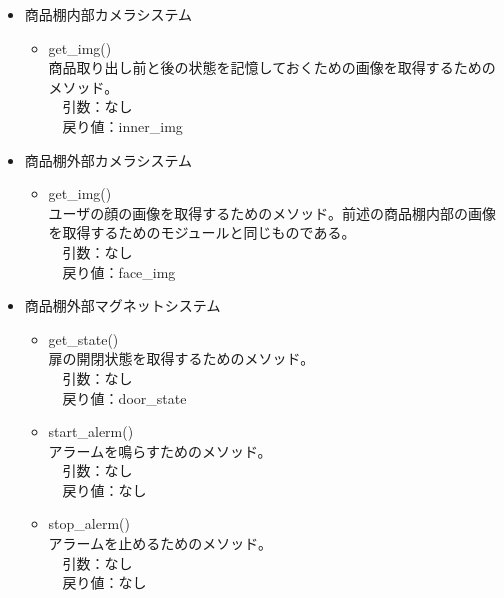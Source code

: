 \documentclass[a4, dvipdfmx, uplatex]{jsarticle}
\begin{document}
\begin{itemize}
\item 商品棚内部カメラシステム \\

\begin{itemize}
\item get\_img() \\
商品取り出し前と後の状態を記憶しておくための画像を取得するためのメソッド。 \\
　引数：なし \\
　戻り値：inner\_img \\
\end{itemize}

\item 商品棚外部カメラシステム \\

\begin{itemize}
\item get\_img() \\
ユーザの顔の画像を取得するためのメソッド。前述の商品棚内部の画像を取得するためのモジュールと同じものである。 \\
　引数：なし \\
　戻り値：face\_img \\
\end{itemize}

\item 商品棚外部マグネットシステム \\

\begin{itemize}
\item get\_state() \\
扉の開閉状態を取得するためのメソッド。 \\
　引数：なし \\
　戻り値：door\_state \\

\item start\_alerm() \\
アラームを鳴らすためのメソッド。 \\
　引数：なし \\
　戻り値：なし \\

\item stop\_alerm() \\
アラームを止めるためのメソッド。 \\
　引数：なし \\
　戻り値：なし \\


\end{itemize}
\end{itemize}
\end{document}
